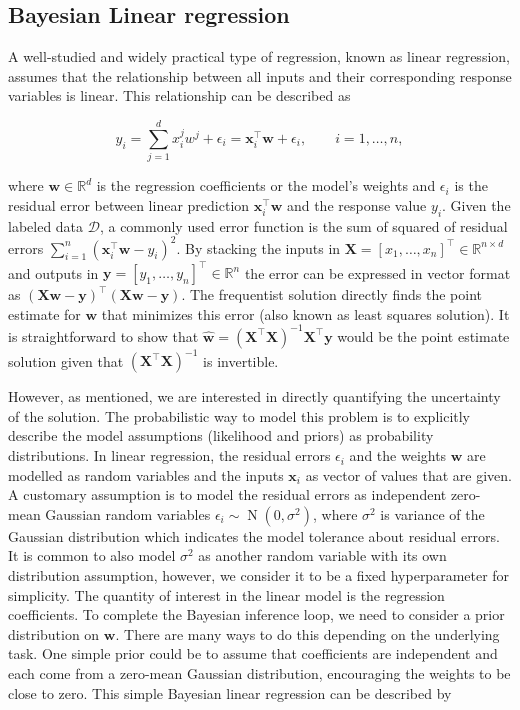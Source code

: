 \documentclass[dissertation,math,vertlayout,pdfa,colorlinks]{aaltoseries}
\newcommand{\bw}{\bm{w}}
\newcommand{\bX}{\bm{X}}
\newcommand{\by}{\bm{y}}
\newcommand{\bD}{\mathcal{D}}
\DeclareMathOperator{\normalpdf}{N}
\newcommand{\tp}{^{\top}}
\begin{document}
\subsection{Bayesian Linear regression}

A well-studied and widely practical type of regression, known as linear regression, assumes that the relationship between all inputs and their corresponding response variables is linear. This relationship can be described as 

\begin{equation*}
y_i= \sum_{j=1}^{d}x_{i}^{j} w^{j}+\epsilon_i=\bm{x}_i\tp\bw+\epsilon_i, \qquad i=1,\ldots,n, 
\end{equation*}

\noindent where $\bw \in \mathbb{R}^d$ is the regression coefficients or the model's weights and $\epsilon_i$ is the residual error between linear prediction $\bm{x}_i\tp\bw$ and the response value $y_i$. Given the labeled data $\bD$, a commonly used error function is the sum of squared of residual errors $\sum_{i=1}^n(\bm{x}_i\tp\bw- y_i)^2$. By stacking the inputs in $\bX = [x_1,\ldots,x_n]\tp \in \mathbb{R}^{n\times d}$ and outputs in $\by = [y_1,\ldots,y_n]\tp \in \mathbb{R}^n$ the error can be expressed in vector format as $(\bX\bw- \by)\tp(\bX\bw- \by)$. The frequentist solution directly finds the point estimate for $\bw$ that minimizes this error (also known as least squares solution). It is straightforward to show that $\hat{\bw} = (\bX \tp \bX)^{-1}\bX\tp \by$  would be the point estimate solution given that $(\bX \tp \bX)^{-1}$ is invertible.  

However, as mentioned, we are interested in directly quantifying the uncertainty of the solution. The probabilistic way to model this problem is to explicitly describe the model assumptions (likelihood and priors) as probability distributions. In linear regression, the residual errors $\epsilon_i$ and the weights $\bw$ are modelled as random variables and the inputs $\bm{x}_i$ as vector of values that are given. A customary assumption is to model the residual errors as independent zero-mean Gaussian random variables $\epsilon_i \sim \normalpdf(0,\sigma^2)$, where $\sigma^2$ is variance of the Gaussian distribution which indicates the model tolerance about residual errors. It is common to also model $\sigma^2$ as another random variable with its own distribution assumption, however, we consider it to be a fixed hyperparameter for simplicity. The quantity of interest in the linear model is the regression coefficients. To complete the Bayesian inference loop, we need to consider a prior distribution on $\bw$. There are many ways to do this depending on the underlying task. One simple prior could be to assume that coefficients are independent and each come from a zero-mean Gaussian distribution, encouraging the weights to be close to zero. This simple Bayesian linear regression can be described by
\end{document}
